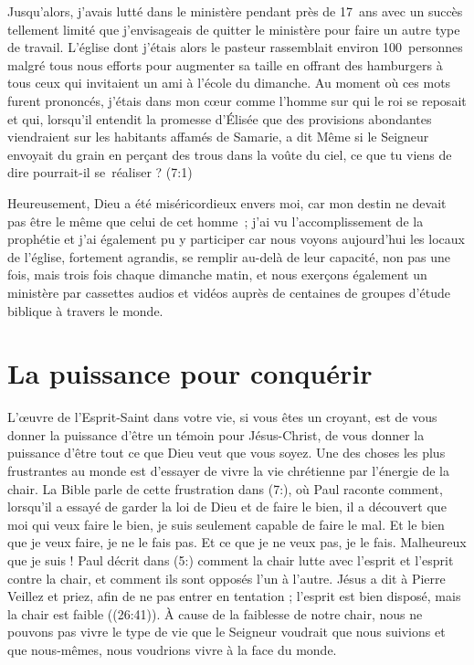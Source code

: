 Jusqu'alors, j'avais lutté dans le ministère pendant près de 17~ans
 avec un succès tellement limité que j'envisageais de quitter le ministère
 pour faire un autre type de travail.
 L'église dont j'étais alors le pasteur rassemblait environ 100~personnes
 malgré tous nous efforts pour augmenter sa taille en offrant des hamburgers
 à tous ceux qui invitaient un ami à l'école du dimanche.
 Au moment où ces mots furent prononcés, j'étais dans mon cœur comme l'homme
 sur qui le roi se reposait et qui, lorsqu'il entendit la promesse d'Élisée
 que des provisions abondantes viendraient sur les habitants affamés
 de Samarie, a dit\frcolon{}
 \Og Même si le Seigneur envoyait du grain en perçant des trous dans
 la voûte du ciel, ce que tu viens de dire pourrait-il se~réaliser ? \Fg{}
 (7:1)

Heureusement, Dieu a été miséricordieux envers moi,
 car mon destin ne devait pas être le même que celui de cet homme~;
 j'ai vu l'ac\-com\-plis\-sement de la prophétie et j'ai également pu y participer
 car nous voyons aujourd'hui les locaux de l'église, fortement agrandis,
 se remplir au-delà de leur capacité, non pas une fois, mais trois fois
 chaque dimanche matin, et nous exerçons également un ministère
 par cassettes audios et vidéos auprès de centaines de groupes
 d'étude biblique à travers le monde.

\section{La puissance pour conqu\'erir}

L'œuvre de l'Esprit-Saint dans votre vie, si vous êtes un croyant,
 est de vous donner la puissance d'être un témoin pour Jésus-Christ,
 de vous donner la puissance d'être tout ce que Dieu veut que vous soyez.
 Une des choses les plus frustrantes au monde est d'essayer
 de vivre la vie chrétienne par l'énergie de la chair.
 La Bible parle de cette frustration dans (7:),
 où Paul raconte comment, lors\-qu'il a essayé de garder la loi de Dieu
 et de faire le bien, il a découvert que \Og moi qui veux faire le bien,
 je suis seulement capable de faire le mal. Et le bien que je veux faire,
 je ne le fais pas. Et ce que je ne veux pas, je le fais.
 Malheureux que je suis ! \Fg{}
 Paul décrit dans (5:) comment la chair lutte avec l'esprit
 et l'esprit contre la chair, et comment ils sont opposés l'un à l'autre.
 Jésus a dit à Pierre\frcolon{}
 \Og Veillez et priez, afin de ne pas entrer en tentation ;
 l'esprit est bien disposé, mais la chair est faible \Fg{}
 ((26:41)).
 À cause de la faiblesse de notre chair, nous ne pouvons pas vivre
 le type de vie que le Seigneur voudrait que nous suivions
 et que nous-mêmes, nous voudrions vivre à la face du monde.

